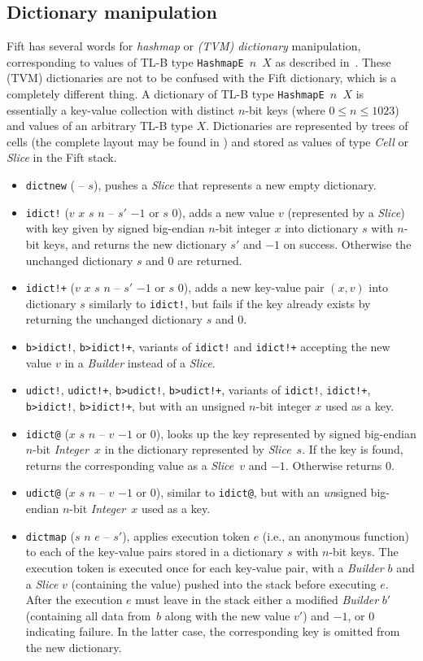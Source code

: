 \documentclass[12pt,oneside]{article}
\def\mysubsection#1{\subsection{#1}\fancyhead[C]{\small{\textsc{\textrm{\thesubsection.} #1}}}}
\begin{document}
\mysubsection{Dictionary manipulation}\label{p:hashmap.ops}
Fift has several words for {\em hashmap\/} or {\em (TVM) dictionary\/} manipulation, corresponding to values of TL-B type {\tt HashmapE $n$ $X$} as described in~\cite[3.3]{TVM}. These (TVM) dictionaries are not to be confused with the Fift dictionary, which is a completely different thing. A dictionary of TL-B type {\tt HashmapE $n$ $X$} is essentially a key-value collection with distinct $n$-bit keys (where $0\leq n\leq 1023$) and values of an arbitrary TL-B type $X$. Dictionaries are represented by trees of cells (the complete layout may be found in \cite[3.3]{TVM}) and stored as values of type {\em Cell\/} or {\em Slice\/} in the Fift stack.
\begin{itemize}
\item {\tt dictnew} ( -- $s$), pushes a {\em Slice\/} that represents a new empty dictionary.
\item {\tt idict!} ($v$ $x$ $s$ $n$ -- $s'$ $-1$ or $s$ $0$), adds a new value $v$ (represented by a {\em Slice}) with key given by signed big-endian $n$-bit integer $x$ into dictionary $s$ with $n$-bit keys, and returns the new dictionary $s'$ and $-1$ on success. Otherwise the unchanged dictionary $s$ and $0$ are returned.
\item {\tt idict!+} ($v$ $x$ $s$ $n$ -- $s'$ $-1$ or $s$ $0$), adds a new key-value pair $(x,v)$ into dictionary $s$ similarly to {\tt idict!}, but fails if the key already exists by returning the unchanged dictionary $s$ and $0$.
\item {\tt b>idict!}, {\tt b>idict!+}, variants of {\tt idict!} and {\tt idict!+} accepting the new value $v$ in a {\em Builder\/} instead of a {\em Slice}.
\item {\tt udict!}, {\tt udict!+}, {\tt b>udict!}, {\tt b>udict!+}, variants of {\tt idict!}, {\tt idict!+}, {\tt b>idict!}, {\tt b>idict!+}, but with an unsigned $n$-bit integer $x$ used as a key.
\item {\tt idict@} ($x$ $s$ $n$ -- $v$ $-1$ or $0$), looks up the key represented by signed big-endian $n$-bit {\em Integer\/}~$x$ in the dictionary represented by {\em Slice\/}~$s$. If the key is found, returns the corresponding value as a {\em Slice\/}~$v$ and $-1$. Otherwise returns $0$.
\item {\tt udict@} ($x$ $s$ $n$ -- $v$ $-1$ or $0$), similar to {\tt idict@}, but with an {\em un}signed big-endian $n$-bit {\em Integer\/}~$x$ used as a key.
\item {\tt dictmap} ($s$ $n$ $e$ -- $s'$), applies execution token $e$ (i.e., an anonymous function) to each of the key-value pairs stored in a dictionary $s$ with $n$-bit keys. The execution token is executed once for each key-value pair, with a {\em Builder\/} $b$ and a {\em Slice\/} $v$ (containing the value) pushed into the stack before executing $e$. After the execution $e$ must leave in the stack either a modified {\em Builder\/} $b'$ (containing all data from~$b$ along with the new value $v'$) and $-1$, or $0$ indicating failure. In the latter case, the corresponding key is omitted from the new dictionary.

\end{itemize}
\end{document}
